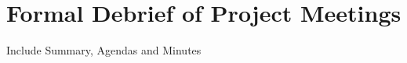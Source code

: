 
\chapter{Formal Debrief of Project Meetings} %

\label{AppendixA} %

Include Summary, Agendas and Minutes